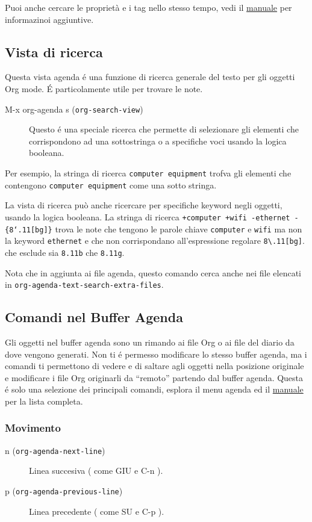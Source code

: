 \documentclass[11pt]{article}
\begin{document}
Puoi anche cercare le proprietà e i tag nello stesso tempo, vedi il
\href{manul}{manuale} per informazinoi aggiuntive.

\subsection{Vista di ricerca}
\label{sec:orgb24d7ca}
Questa vista agenda é una funzione di ricerca generale del testo per
gli oggetti Org mode. É particolamente utile per trovare le note.

\begin{description}
\item[{M-x org-agenda s (\texttt{org-search-view})}] Questo é una speciale ricerca che permette di selezionare gli
elementi che corrispondono ad una sottostringa o a specifiche voci
usando la logica booleana.
\end{description}

Per esempio, la stringa di ricerca \texttt{computer equipment} trofva gli
elementi che contengono \texttt{computer equipment} come una sotto stringa.

La vista di ricerca può anche ricercare per specifiche keyword negli
oggetti, usando la logica booleana. La stringa di ricerca \texttt{+computer
+wifi -ethernet -\{8`.11[bg]\}} trova le note che tengono le parole
chiave \texttt{computer} e \texttt{wifi} ma non la keyword \texttt{ethernet} e che non
corrispondano all'espressione regolare \texttt{8\textbackslash{}.11[bg]}. che esclude sia
\texttt{8.11b} che \texttt{8.11g}.

Nota che in aggiunta ai file agenda, questo comando cerca anche nei
file elencati in \texttt{org-agenda-text-search-extra-files}.

\subsection[Agenda Commands]{Comandi nel Buffer Agenda}
\label{sec:org15525c6}
Gli oggetti nel buffer agenda sono un rimando ai file Org o ai file
del diario da dove vengono generati. Non ti é permesso modificare lo
stesso buffer agenda, ma i comandi ti permettono di vedere e di
saltare agli oggetti nella posizione originale e modificare i file Org
originarli da ``remoto'' partendo dal buffer agenda. Questa é solo una
selezione dei principali comandi, esplora il menu agenda ed il \href{manual}{manuale}
per la lista completa.

\subsubsection*{Movimento}
\label{sec:orgbbfd5f2}
\begin{description}
\item[{n (\texttt{org-agenda-next-line})}] Linea succesiva ( come GIU e C-n ).

\item[{p (\texttt{org-agenda-previous-line})}] Linea precedente ( come SU e C-p ).
\end{description}
\end{document}
